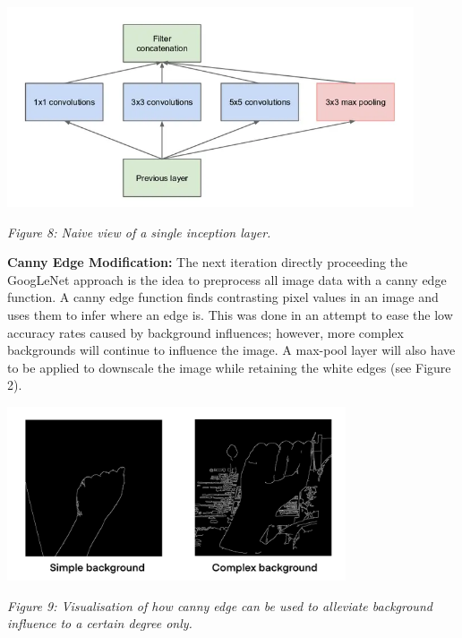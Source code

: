 \documentclass[11pt]{article}
\def\paraskip{\vskip 0.4cm}
\begin{document}
        \begin{center}
            \includegraphics[width=12cm]{images/inceptionlayer.png}
            \\
            \raggedright \textit{
            Figure 8: Naive view of a single inception layer.
            }
        \end{center}

        \paraskip

        \noindent\textbf{Canny Edge Modification: } The next iteration directly proceeding the GoogLeNet approach is the idea to preprocess all image data with a canny edge function. A canny edge function finds contrasting pixel values in an image and uses them to infer where an edge is. This was done in an attempt to ease the low accuracy rates caused by background influences; however, more complex backgrounds will continue to influence the image. A max-pool layer will also have to be applied to downscale the image while retaining the white edges (see Figure 2). 

        \begin{center}
            \includegraphics[width=10cm]{images/canny.png}
            \\
            \raggedright \textit{
            Figure 9: Visualisation of how canny edge can be used to alleviate background influence to a certain degree only.
            }
        \end{center}
\end{document}
